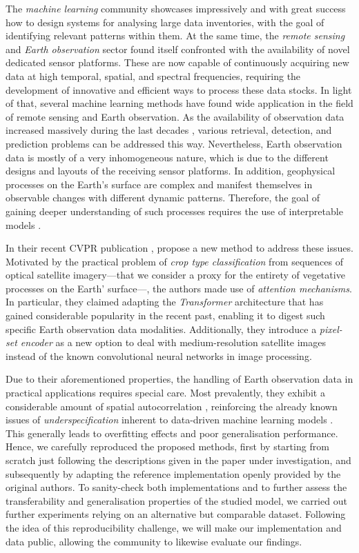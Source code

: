 The \emph{machine learning} community showcases impressively and with great success how to design systems for analysing large data inventories, with the goal of identifying relevant patterns within them.
At the same time, the \emph{remote sensing} and \emph{Earth observation} sector found itself confronted with the availability of novel dedicated sensor platforms.
These are now capable of continuously acquiring new data at high temporal, spatial, and spectral frequencies, requiring the development of innovative and efficient ways to process these data stocks.
In light of that, several machine learning methods have found wide application in the field of remote sensing and Earth observation.
As the availability of observation data increased massively during the last decades \parencite{Lary18:MLA}, various retrieval, detection, and prediction problems can be addressed this way.
Nevertheless, Earth observation data is mostly of a very inhomogeneous nature, which is due to the different designs and layouts of the receiving sensor platforms.
In addition, geophysical processes on the Earth's surface are complex and manifest themselves in observable changes with different dynamic patterns.
Therefore, the goal of gaining deeper understanding of such processes requires the use of interpretable models \parencite{Maxwell18:IML}.

In their recent CVPR publication , \textcite{Garnot20:SIT} propose a new method to address these issues.
Motivated by the practical problem of \emph{crop type classification} from sequences of optical satellite imagery---that we consider a proxy for the entirety of vegetative processes on the Earth' surface---, the authors made use of \emph{attention mechanisms}.
In particular, they claimed adapting the \emph{Transformer} architecture \parencite{Vaswani17:Attention} that has gained considerable popularity in the recent past, enabling it to digest such specific Earth observation data modalities.
Additionally, they introduce a \emph{pixel-set encoder} as a new option to deal with medium-resolution satellite images instead of the known convolutional neural networks in image processing.

Due to their aforementioned properties, the handling of Earth observation data in practical applications requires special care.
Most prevalently, they exhibit a considerable amount of spatial autocorrelation \parencite{Spiker07:SSA}, reinforcing the already known issues of \emph{underspecification} inherent to data-driven machine learning models \parencite{DAmour20:UPC}.
This generally leads to overfitting effects and poor generalisation performance.
Hence, we carefully reproduced the proposed methods, first by starting from scratch just following the descriptions given in the paper under investigation, and subsequently by adapting the reference implementation openly provided by the original authors.
To sanity-check both implementations and to further assess the transferability and generalisation properties of the studied model, we carried out further experiments relying on an alternative but comparable dataset.
Following the idea of this reproducibility challenge, we will make our implementation and data public, allowing the community to likewise evaluate our findings.

